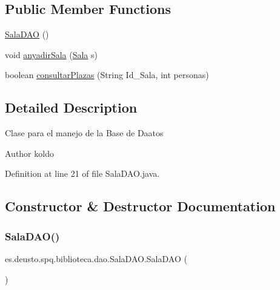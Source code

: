 \subsection*{Public Member Functions}
\begin{DoxyCompactItemize}
\item 
\mbox{\hyperlink{classes_1_1deusto_1_1spq_1_1biblioteca_1_1dao_1_1_sala_d_a_o_ab7f0df9b8c8164008abb22df95c72a4b}{Sala\+D\+AO}} ()
\item 
void \mbox{\hyperlink{classes_1_1deusto_1_1spq_1_1biblioteca_1_1dao_1_1_sala_d_a_o_ab057300f33df6ae974e6e949900b1dc7}{anyadir\+Sala}} (\mbox{\hyperlink{classes_1_1deusto_1_1spq_1_1biblioteca_1_1data_1_1_sala}{Sala}} s)
\item 
boolean \mbox{\hyperlink{classes_1_1deusto_1_1spq_1_1biblioteca_1_1dao_1_1_sala_d_a_o_a3095e0681af1d32bd5706ca6941e0784}{consultar\+Plazas}} (String Id\+\_\+\+Sala, int personas)
\end{DoxyCompactItemize}


\subsection{Detailed Description}
Clase para el manejo de la Base de Daatos \begin{DoxyAuthor}{Author}
koldo 
\end{DoxyAuthor}


Definition at line 21 of file Sala\+D\+A\+O.\+java.



\subsection{Constructor \& Destructor Documentation}
\mbox{\label{classes_1_1deusto_1_1spq_1_1biblioteca_1_1dao_1_1_sala_d_a_o_ab7f0df9b8c8164008abb22df95c72a4b}} 
\subsubsection{\texorpdfstring{Sala\+D\+A\+O()}{SalaDAO()}}
{\footnotesize\ttfamily es.\+deusto.\+spq.\+biblioteca.\+dao.\+Sala\+D\+A\+O.\+Sala\+D\+AO (\begin{DoxyParamCaption}{ }\end{DoxyParamCaption})}

